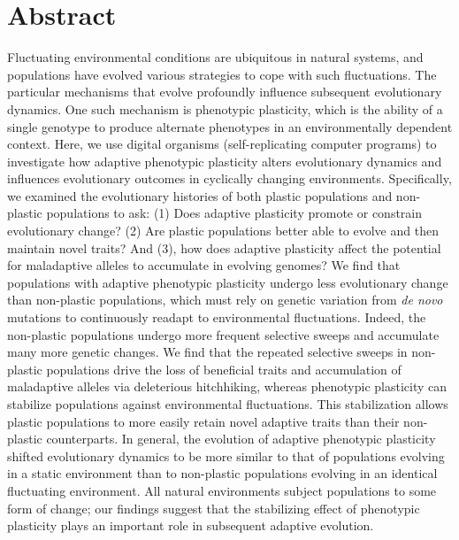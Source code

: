 




\section*{Abstract}
Fluctuating environmental conditions are ubiquitous in natural systems, and populations have evolved various strategies to cope with such fluctuations.
The particular mechanisms that evolve profoundly influence subsequent evolutionary dynamics.
One such mechanism is phenotypic plasticity, which is the ability of a single genotype to produce alternate phenotypes in an environmentally dependent context.
Here, we use digital organisms (self-replicating computer programs) to investigate how adaptive phenotypic plasticity alters evolutionary dynamics and influences evolutionary outcomes in cyclically changing environments.
Specifically, we examined the evolutionary histories of both plastic populations and non-plastic populations to ask:
(1) Does adaptive plasticity promote or constrain evolutionary change?
(2) Are plastic populations better able to evolve and then maintain novel traits?
And (3), how does adaptive plasticity affect the potential for maladaptive alleles to accumulate in evolving genomes?
We find that populations with adaptive phenotypic plasticity undergo less evolutionary change than non-plastic populations, which must rely on genetic variation from \textit{de novo} mutations to continuously readapt to environmental fluctuations.
Indeed, the non-plastic populations undergo more frequent selective sweeps and accumulate many more genetic changes.
We find that the repeated selective sweeps in non-plastic populations drive the loss of beneficial traits and accumulation of maladaptive alleles via deleterious hitchhiking, whereas phenotypic plasticity can stabilize populations against environmental fluctuations.
This stabilization allows plastic populations to more easily retain novel adaptive traits than their non-plastic counterparts.
In general, the evolution of adaptive phenotypic plasticity shifted evolutionary dynamics to be more similar to that of populations evolving in a static environment than to non-plastic populations evolving in an identical fluctuating environment.
All natural environments subject populations to some form of change; our findings suggest that the stabilizing effect of phenotypic plasticity plays an important role in subsequent adaptive evolution.

% 

